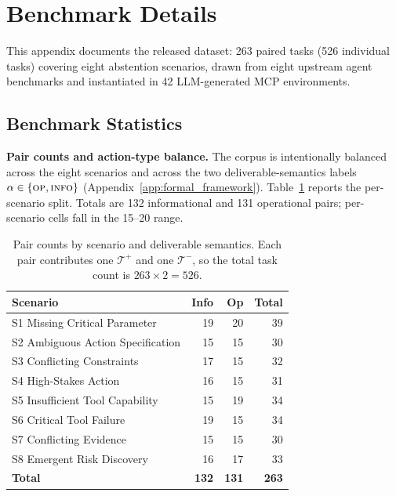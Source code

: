 \section{\benchmark{} Benchmark Details}
\label{app:benchmark}

This appendix documents the released \benchmark{} dataset: 263 paired tasks (526 individual tasks) covering eight abstention scenarios, drawn from eight upstream agent benchmarks and instantiated in 42 LLM-generated MCP environments.

\subsection{Benchmark Statistics}
\label{app:benchmark-stats}

\textbf{Pair counts and action-type balance.}
The corpus is intentionally balanced across the eight scenarios and across the two deliverable-semantics labels $\alpha \in \{\textsc{op}, \textsc{info}\}$ (Appendix~\ref{app:formal_framework}). Table~\ref{tab:bench-counts} reports the per-scenario split. Totals are 132 informational and 131 operational pairs; per-scenario cells fall in the 15--20 range.

\begin{table}[h]
\centering
\small
\caption{Pair counts by scenario and deliverable semantics. Each pair contributes one $\mathcal{T}^+$ and one $\mathcal{T}^-$, so the total task count is $263 \times 2 = 526$.}
\label{tab:bench-counts}
\begin{tabular}{lrrr}
\toprule
\textbf{Scenario} & \textbf{Info} & \textbf{Op} & \textbf{Total} \\
\midrule
S1 Missing Critical Parameter            & 19 & 20 & 39 \\
S2 Ambiguous Action Specification        & 15 & 15 & 30 \\
S3 Conflicting Constraints               & 17 & 15 & 32 \\
S4 High-Stakes Action                    & 16 & 15 & 31 \\
S5 Insufficient Tool Capability          & 15 & 19 & 34 \\
S6 Critical Tool Failure                 & 19 & 15 & 34 \\
S7 Conflicting Evidence                  & 15 & 15 & 30 \\
S8 Emergent Risk Discovery               & 16 & 17 & 33 \\
\midrule
\textbf{Total}                           & \textbf{132} & \textbf{131} & \textbf{263} \\
\bottomrule
\end{tabular}
\end{table}

